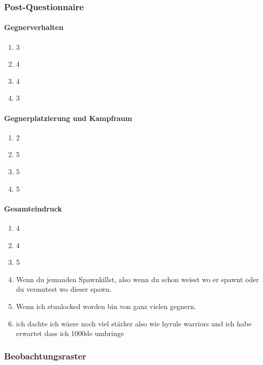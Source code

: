 \documentclass[../Main.tex]{subfiles}
\begin{document}
\subsubsection{Post-Questionnaire}

\paragraph{Gegnerverhalten}
\begin{enumerate}[label=\textbf{Q\arabic*}, leftmargin=1.5cm, itemsep=0.5em]
\item 3
\item 4
\item 4
\item 3
\end{enumerate}

\paragraph{Gegnerplatzierung und Kampfraum}
\begin{enumerate}[label=\textbf{Q\arabic*}, leftmargin=1.5cm, itemsep=0.5em, resume]
\item 2
\item 5
\item 5
\item 5
\end{enumerate}

\paragraph{Gesamteindruck}
\begin{enumerate}[label=\textbf{Q\arabic*}, leftmargin=1.5cm, itemsep=0.5em, resume]
\item 4
\item 4
\item 5
\item Wenn du jemanden Spawnkillst, also wenn du schon weisst wo er spawnt oder du vermutest wo dieser spawn.
\item Wenn ich stunlocked worden bin von ganz vielen gegnern.
\item ich dachte ich wäere noch viel stärker also wie hyrule warriors und ich habe erwartet dass ich 1000de umbringe
\end{enumerate}

\subsubsection{Beobachtungsraster}
\end{document}
